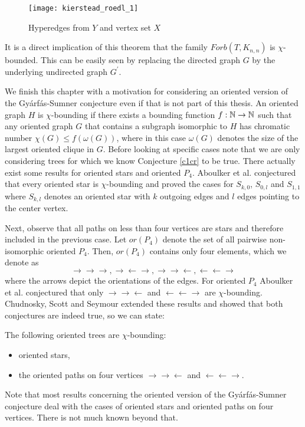 \begin{figure}[ht]
\begin{center}
\texttt{[image: kierstead\_roedl\_1]}
\end{center}
\caption{Hyperedges from $Y$ and vertex set $X$}
\label{f4cr}
\end{figure}

\begin{note}
It is a direct implication of this theorem that the family $\textit{Forb}(T,K_{n,n})$ is $\chi$-bounded. This can be easily seen by replacing the directed graph $G$ by the underlying undirected graph $G^\prime$.
\end{note}

We finish this chapter with a motivation for considering an oriented version of the Gyárfás-Sumner conjecture even if that is not part of this thesis. An oriented graph $H$ is $\chi$-bounding if there exists a bounding function $f:\mathbb{N}\to\mathbb{N}$ such that any oriented graph $G$ that contains a subgraph isomorphic to $H$ has chromatic number $\chi (G)\leq f(\omega (G))$, where in this case $\omega (G)$ denotes the size of the largest oriented clique in $G$. Before looking at specific cases note that we are only considering trees for which we know Conjecture \ref{c1cr} to be true. There actually exist some results for oriented stars and oriented $P_4$. Aboulker et al. \cite{Ab16} conjectured that every oriented star is $\chi$-bounding and proved the cases for $S_{k,0}$, $S_{0,l}$ and $S_{1,1}$ where $S_{k,l}$ denotes an oriented star with $k$ outgoing edges and $l$ edges pointing to the center vertex. 

Next, observe that all paths on less than four vertices are stars and therefore included in the previous case. Let $or(P_4)$ denote the set of all pairwise non-isomorphic oriented $P_4$. Then, $or(P_4)$ contains only four elements, which we denote as \[\rightarrow\rightarrow\rightarrow , \rightarrow\leftarrow\rightarrow , \rightarrow\rightarrow\leftarrow , \leftarrow\leftarrow\rightarrow\] where the arrows depict the orientations of the edges. For oriented $P_4$ Aboulker et al. \cite{Ab16} conjectured that only $\rightarrow\rightarrow\leftarrow$ and $\leftarrow\leftarrow\rightarrow$ are $\chi$-bounding. Chudnosky, Scott and Seymour \cite{CSS17b} extended these results and showed that both conjectures are indeed true, so we can state:

\begin{thm}
The following oriented trees are $\chi$-bounding:
\begin{itemize}
\item oriented stars,
\item the oriented paths on four vertices $\rightarrow\rightarrow\leftarrow$ and $\leftarrow\leftarrow\rightarrow$.
\end{itemize}
\end{thm}

Note that most results concerning the oriented version of the Gyárfás-Sumner conjecture deal with the cases of oriented stars and oriented paths on four vertices. There is not much known beyond that.